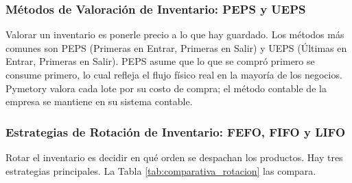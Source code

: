 \subsubsection{Métodos de Valoración de Inventario: PEPS y UEPS}
\label{sssec:peps_ueps}

Valorar un inventario es ponerle precio a lo que hay guardado. Los métodos más comunes son PEPS (Primeras en Entrar, Primeras en Salir) y UEPS (Últimas en Entrar, Primeras en Salir). PEPS asume que lo que se compró primero se consume primero, lo cual refleja el flujo físico real en la mayoría de los negocios. Pymetory valora cada lote por su costo de compra; el método contable de la empresa se mantiene en su sistema contable.

\subsubsection{Estrategias de Rotación de Inventario: FEFO, FIFO y LIFO}
\label{sssec:fefo_fifo_lifo}

Rotar el inventario es decidir en qué orden se despachan los productos. Hay tres estrategias principales. La Tabla \ref{tab:comparativa_rotacion} las compara.

